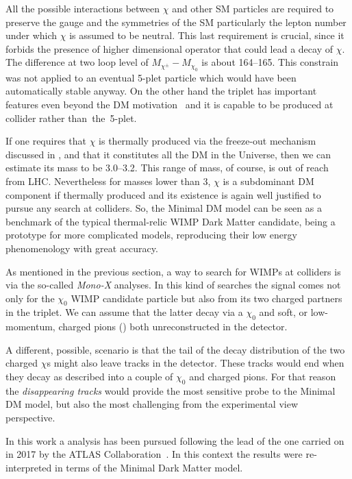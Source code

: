 All the possible interactions between $\chi$ and other SM particles are required to preserve the gauge and the symmetries of the SM particularly the lepton number under which $\chi$ is assumed to be neutral. This last requirement is crucial, since it forbids the presence of higher dimensional operator that could lead a decay of $\chi$.  The difference at two loop level of $M_{\chi^\pm} - M_{\chi_0}$ is  about \SIrange{164}{165}{\mev}. This constrain was not applied to an eventual 5-plet particle which would have been automatically stable anyway. On the other hand the triplet has important features even beyond the DM motivation~\cite{Cirelli:paper} and it is capable to be produced at collider rather \mbox{than the 5-plet}.

If one requires that $\chi$ is thermally produced via the freeze-out mechanism discussed in \Sect{\ref{sec:wimp}}, and that it constitutes all the DM in the Universe, then we can estimate its mass to be \SIrange{3.0}{3.2}{\tev}. This range of mass, of course, is out of reach from LHC. Nevertheless for masses lower than \SI{3}{\tev}, $\chi$ is a subdominant DM component if thermally produced and its existence is again well justified to pursue any search at colliders. So, the Minimal DM model can be seen as a benchmark of the typical thermal-relic WIMP Dark Matter candidate, being a prototype for more complicated models, reproducing their low energy phenomenology with great accuracy.

As mentioned in the previous section, a way to search for WIMPs at colliders is via the so-called \emph{Mono-X} analyses. In this kind of searches the signal comes not only for the $\chi_0$ WIMP candidate particle but also from its two charged partners in the triplet. We can assume that the latter decay via a $\chi_0$ and soft, or low-momentum, charged pions (\pipm) both unreconstructed in the detector. 

A different, possible, scenario is that the tail of the decay distribution of the two charged $\chi$s might also leave tracks in the detector. These tracks would end when they decay as described into a couple of $\chi_0$ and charged pions. For that reason the \emph{disappearing tracks} would provide the most sensitive probe to the Minimal DM model, but also the most challenging from the experimental view perspective.

\smallskip
In this work a \mph analysis has been pursued following the lead of the one carried on in 2017 by the ATLAS Collaboration~\cite{paperMP}. In this context the \mph results were re-interpreted in terms of the Minimal Dark Matter model.










